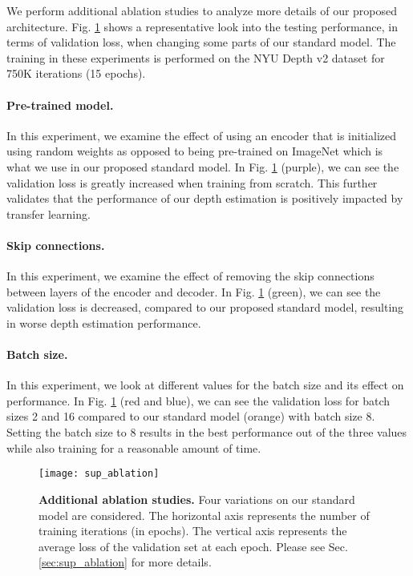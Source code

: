 \documentclass[10pt,twocolumn,letterpaper]{article}
\begin{document}
We perform additional ablation studies to analyze more details of our proposed architecture. Fig. \ref{fig:sup_ablation} shows a representative look into the testing performance, in terms of validation loss, when changing some parts of our standard model. The training in these experiments is performed on the NYU Depth v2 dataset \cite{Silberman2012} for 750K iterations (15 epochs).

\paragraph{Pre-trained model.} In this experiment, we examine the effect of using an encoder that is initialized using random weights as opposed to being pre-trained on ImageNet which is what we use in our proposed standard model. In Fig. \ref{fig:sup_ablation} (purple), we can see the validation loss is greatly increased when training from scratch. This further validates that the performance of our depth estimation is positively impacted by transfer learning.

\paragraph{Skip connections.} In this experiment, we examine the effect of removing the skip connections between layers of the encoder and decoder. In Fig. \ref{fig:sup_ablation} (green), we can see the validation loss is decreased, compared to our proposed standard model, resulting in worse depth estimation performance.


\paragraph{Batch size.} In this experiment, we look at different values for the batch size and its effect on performance. In Fig. \ref{fig:sup_ablation} (red and blue), we can see the validation loss for batch sizes 2 and 16 compared to our standard model (orange) with batch size 8. Setting the batch size to 8 results in the best performance out of the three values while also training for a reasonable amount of time.



\begin{figure}[t!]
\begin{center}
\texttt{[image: sup\_ablation]}
\end{center}
   \caption{\textbf{Additional ablation studies.} Four variations on our standard model are considered. The horizontal axis represents the number of training iterations (in epochs). The vertical axis represents the average loss of the validation set at each epoch. Please see Sec. \ref{sec:sup_ablation} for more details. }
\label{fig:sup_ablation}
\end{figure}
\end{document}
